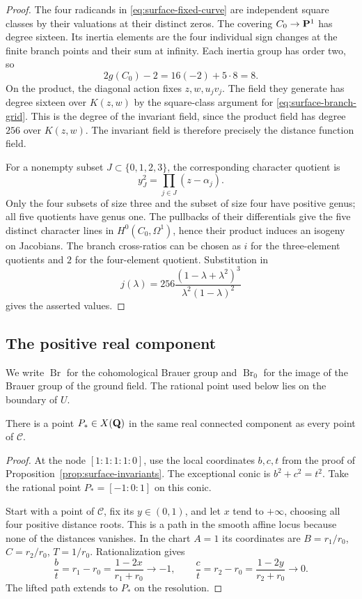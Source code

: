 \begin{proof}
The four radicands in \eqref{eq:surface-fixed-curve} are independent
square classes by their valuations at their distinct zeros.  The
covering $C_0\to\mathbf P^1$ has degree sixteen.  Its inertia elements are
the four individual sign changes at the finite branch points and their
sum at infinity.  Each inertia group has order two, so
\[
 2g(C_0)-2=16(-2)+5\cdot8=8.
\]
On the product, the diagonal action fixes $z,w,u_jv_j$.  The field
they generate has degree sixteen over $K(z,w)$ by the square-class
argument for \eqref{eq:surface-branch-grid}.  This is the degree of
the invariant field, since the product field has degree $256$ over
$K(z,w)$.  The invariant field is therefore precisely the distance
function field.

For a nonempty subset $J\subset\{0,1,2,3\}$, the corresponding
character quotient is
\[
 y_J^2=\prod_{j\in J}(z-\alpha_j).
\]
Only the four subsets of size three and the subset of size four
have positive genus; all five quotients have genus one.  The
pullbacks of their differentials give the five distinct character
lines in $H^0(C_0,\Omega^1)$, hence their product induces an isogeny
on Jacobians.  The branch cross-ratios can be chosen as $i$ for the
three-element quotients and $2$ for the four-element quotient.
Substitution in
\[
 j(\lambda)=256\frac{(1-\lambda+\lambda^2)^3}
                         {\lambda^2(1-\lambda)^2}
\]
gives the asserted values.
\end{proof}

\subsection{The positive real component}

We write $\operatorname{Br}$ for the cohomological Brauer group and
$\operatorname{Br}_0$ for the image of the Brauer group of the ground
field.  The rational point used below lies on the boundary
of $U$.

\begin{lemma}\label{lem:surface-real-boundary}
There is a point $P_*\in X(\mathbf Q)$ in the same real connected
component as every point of $\mathcal C$.
\end{lemma}

\begin{proof}
At the node $[1:1:1:1:0]$, use the local coordinates $b,c,t$ from
the proof of Proposition~\ref{prop:surface-invariants}.  The
exceptional conic is $b^2+c^2=t^2$.  Take the rational point
$P_*=[-1:0:1]$ on this conic.

Start with a point of $\mathcal C$, fix its $y\in(0,1)$, and let
$x$ tend to $+\infty$, choosing all four positive distance roots.
This is a path in the smooth affine locus because none of the
distances vanishes.  In the chart $A=1$ its coordinates are
$B=r_1/r_0$, $C=r_2/r_0$, $T=1/r_0$.  Rationalization gives
\[
 \frac b t=r_1-r_0=\frac{1-2x}{r_1+r_0}\longrightarrow-1,
 \qquad
 \frac c t=r_2-r_0=\frac{1-2y}{r_2+r_0}\longrightarrow0.
\]
The lifted path extends to $P_*$ on the resolution.
\end{proof}

